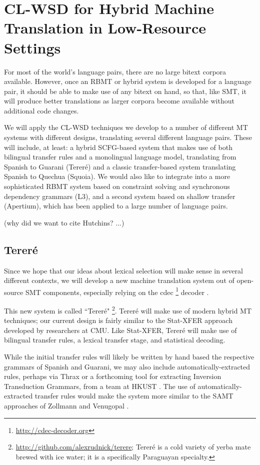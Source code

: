 \section{CL-WSD for Hybrid Machine Translation in Low-Resource Settings}
For most of the world's language pairs, there are no large bitext corpora
available.
However, once an RBMT or hybrid system is developed for a language pair, it
should be able to make use of any bitext on hand, so that, like SMT, it will
produce better translations as larger corpora become available without
additional code changes.

We will apply the CL-WSD techniques we develop to a number of different MT
systems with different designs, translating several different language pairs.
These will include, at least: a hybrid SCFG-based system that makes use of both
bilingual transfer rules and a monolingual language model, translating from
Spanish to Guarani (Tereré) and a classic transfer-based system translating
Spanish to Quechua (Squoia).
We would also like to integrate into a more sophisticated RBMT system based on
constraint solving and synchronous dependency grammars (L3),
and a second system based on shallow transfer (Apertium), which has been
applied to a large number of language pairs.


(why did we want to cite Hutchins? ...)
\cite{hutchins1992introduction}


\subsection{Tereré}
Since we hope that our ideas about lexical selection will make sense in several
different contexts, we will develop a new machine translation system out of
open-source SMT components, especially relying on the cdec
\footnote{\url{http://cdec-decoder.org}} decoder \cite{Dyer_etal_2010}.

This new system is called ``Tereré"
\footnote{\url{http://github.com/alexrudnick/terere}; 
Tereré is a cold variety of yerba mate brewed with ice water; it is a
specifically Paraguayan specialty.}.
Tereré will make use of modern hybrid MT techniques; our current design is
fairly similar to the Stat-XFER approach \cite{DBLP:conf/cicling/Lavie08}
developed by researchers at CMU.
Like Stat-XFER, Tereré will make use of bilingual transfer rules, a lexical
transfer stage, and statistical decoding.

While the initial transfer rules will likely be written by hand based the
respective grammars of Spanish and Guarani, we may also include
automatically-extracted rules, perhaps via Thrax \cite{weese-EtAl:2011:WMT} or
a forthcoming tool for extracting Inversion Transduction Grammars, from a team
at HKUST \cite{saers-addanki-wu:2013:HyTra}. The use of automatically-extracted
transfer rules would make the system more similar to the SAMT approaches of
Zollmann and Venugopal .

